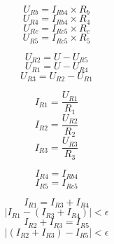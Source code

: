 \documentclass{article}
\begin{document}
\sloppy
\[
    U_{Rb} = I_{Rb4} \times R_b
\]
\[
    U_{R4} = I_{Rb4} \times R_4
\]
\[
    U_{Rc} = I_{Rc5} \times R_c
\]
\[
    U_{R5} = I_{Rc5} \times R_5
\]

\[
    U_{R2} = U - U_{R5}
\]
\[
    U_{R1} = U - U_{R4}
\]
\[
    U_{R3} = U_{R2} - U_{R1}
\]

\[
    I_{R1} = \frac{U_{R1}}{R_1}
\]
\[
    I_{R2} = \frac{U_{R2}}{R_2}
\]
\[
    I_{R3} = \frac{U_{R3}}{R_3}
\]

\[
    I_{R4} = I_{Rb4}
\]
\[
    I_{R5} = I_{Rc5}
\]

\[
    I_{R1} = I_{R3} + I_{R4}
\]
\[
    \lvert I_{R1} - (I_{R3} + I_{R4}) \rvert < \epsilon
\]
\[
    I_{R2} + I_{R3} = I_{R5}
\]
\[
    \lvert (I_{R2} + I_{R3}) - I_{R5} \rvert < \epsilon
\]
\end{document}

